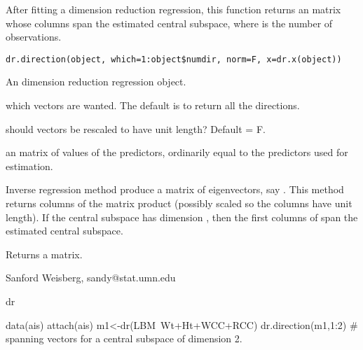 \begin{Description}\relax
After fitting a dimension reduction regression, this function returns an 
 matrix whose columns span the estimated
central subspace, where  is the number of observations.\end{Description}
\begin{Usage}
\begin{verbatim}
dr.direction(object, which=1:object$numdir, norm=F, x=dr.x(object))
\end{verbatim}
\end{Usage}
\begin{Arguments}
\begin{ldescription}
\item[\code{object}] An dimension reduction regression object.
\item[\code{which}] which vectors are wanted.  The default is to return all the
directions.
\item[\code{norm}] should vectors be rescaled to have unit length? Default = F.
\item[\code{x}] 
\end{ldescription}
an  matrix of values of the 
predictors, ordinarily equal to the predictors used for estimation.\end{Arguments}
\begin{Details}\relax
Inverse regression method produce a matrix of eigenvectors, say .  This
method returns columns of the matrix product  (possibly scaled so the 
columns have unit length).  If the central subspace has dimension ,
then the first  columns of  span the estimated central
subspace.\end{Details}
\begin{Value}
Returns a matrix.\end{Value}
\begin{Author}\relax
Sanford Weisberg, sandy@stat.umn.edu\end{Author}
\begin{SeeAlso}\relax
dr\end{SeeAlso}
\begin{Examples}
\begin{ExampleCode}
data(ais)
attach(ais)
m1<-dr(LBM~Wt+Ht+WCC+RCC)
dr.direction(m1,1:2) # spanning vectors for a central subspace of dimension 2.
\end{ExampleCode}
\end{Examples}

